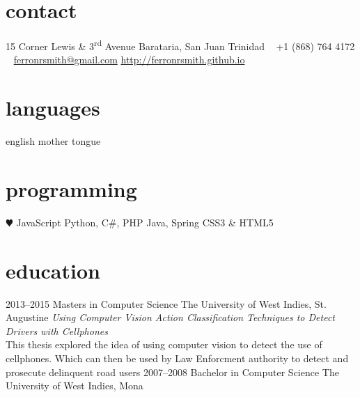 \documentclass[]{friggeri-cv} %
\begin{document}


\begin{aside} %
\section{contact}
15 Corner Lewis \& 3\textsuperscript{rd} Avenue
Barataria, San Juan
Trinidad
~
+1 (868) 764 4172
~
\href{mailto:ferronrsmith@gmail.com}{ferronrsmith@gmail.com}
\href{http://ferronrsmith.github.io}{http://ferronrsmith.github.io}
\section{languages}
english mother tongue
\section{programming}
{\color{red} $\varheartsuit$} JavaScript
Python, C\#, PHP
Java, Spring 
CSS3 \& HTML5
\end{aside}


\section{education}

\begin{entrylist}
\entry
{2013--2015}
{Masters {\normalfont in Computer Science}}
{The University of West Indies, St. Augustine}
{\emph{Using Computer Vision Action Classification Techniques to Detect Drivers with Cellphones} \\ This thesis explored the idea of using computer vision to detect the use of cellphones. Which can then be used by Law Enforcment authority to detect and prosecute delinquent road users }
\entry
{2007--2008}
{Bachelor {\normalfont  in Computer Science}}
{The University of West Indies, Mona}
{}
\end{entrylist}
\end{document}
